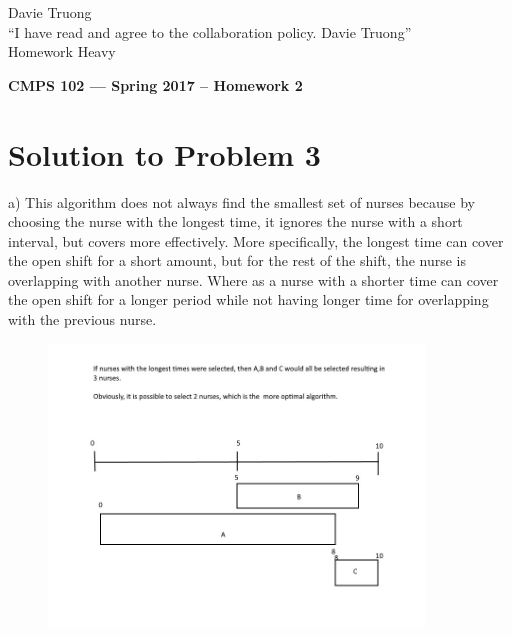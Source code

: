 \documentclass[11pt]{article}
\begin{document}
\begin{text} 
Davie Truong\\
“I have read and agree to the collaboration policy. Davie Truong”\\
Homework Heavy \\
\end{text}


\begin{center}
{\bf\Large CMPS 102 --- Spring 2017 --  Homework 2}
\end{center}

\section*{Solution to Problem 3}

\begin{text} 
a)
This algorithm does not always find the smallest set of nurses because by choosing the nurse with the longest time, it ignores the nurse with a short interval, but covers more effectively. More specifically, the longest time can cover the open shift for a short amount, but for the rest of the shift, the nurse is overlapping with another nurse. Where as a nurse with a shorter time can cover the open shift for a longer period while not having longer time for overlapping with the previous nurse. 
\begin{figure}[h]
\centering
\includegraphics[width=100mm]{nurseGraphic}
\end{figure}
\end{text}
\end{document}
